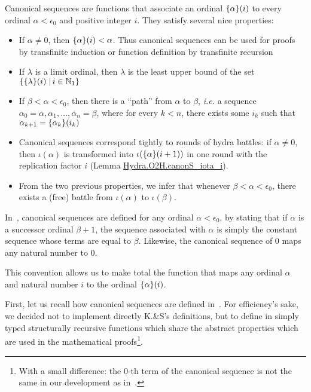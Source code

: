 Canonical sequences are functions that associate an ordinal $\mbox{$\{\alpha\}(i)$}$ to every ordinal $\alpha<\epsilon_0$ and positive integer $i$. They satisfy several nice properties:

\begin{itemize}
\item If $\alpha\not=0$, then $\mbox{$\{\alpha\}(i)$}<\alpha$. Thus canonical sequences can be used for proofs by transfinite induction or function definition by transfinite recursion
\item If $\lambda$ is a limit ordinal, then $\lambda$ is the least upper bound of the set 
$\{\mbox{$\{\lambda\}(i)$}\;|\,i\in\mathbb{N}_1\}$


\item If $\beta<\alpha<\epsilon_0$, then there is a ``path'' from $\alpha$ to $\beta$, \emph{i.e.} a
sequence $\alpha_0=\alpha, \alpha_1, \dots, \alpha_n=\beta$, where for every $k<n$, there exists some $i_k$ such that $\alpha_{k+1}=\mbox{$\{\alpha_k\}(i_k)$}$
\item Canonical sequences correspond tightly to rounds of hydra battles: if $\alpha\not=0$,
then $\iota(\alpha)$ is transformed into $\iota(\mbox{$\{\alpha\}(i+1)$})$ in one round with
the replication factor $i$ (Lemma \href{../theories/html/hydras.Hydra.O2H.html\#canonS_iota_i}{Hydra.O2H.canonS\_iota\_i}).
\item From the two previous properties, we infer that whenever $\beta<\alpha<\epsilon_0$, there exists a (free) battle from $\iota(\alpha)$ to $\iota(\beta)$.
\end{itemize}

\begin{remark}
  In~\cite{KS81}, canonical sequences are defined for any ordinal $\alpha <\epsilon_0$,
by stating that if $\alpha$ is a successor ordinal $\beta+1$,  the sequence associated with 
$\alpha$ is simply the constant sequence whose terms are equal to $\beta$.
Likewise, the canonical sequence of $0$ maps any natural number to $0$.

This convention allows us to make total the function that maps any ordinal $\alpha$ and natural number $i$ to the ordinal $\mbox{$\{\alpha\}(i)$}$.

\end{remark}


First, let us recall how canonical sequences are defined in~\cite{KS81}. For efficiency's sake, we decided not to implement directly K.\&S's definitions, but to define in \gallina{} simply typed structurally recursive functions which share the abstract properties which are used in the mathematical proofs\footnote{With a small difference: the $0$-th term of the canonical sequence is not the same in our development as in~\cite{KS81}.}.





